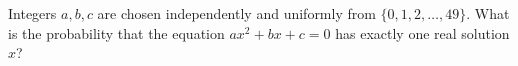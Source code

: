 Integers $a,b,c$ are chosen independently and uniformly from $\{0,1,2,\dots,49\}$. What is the probability that the equation $ax^2+bx+c=0$ has exactly one real solution $x$?
